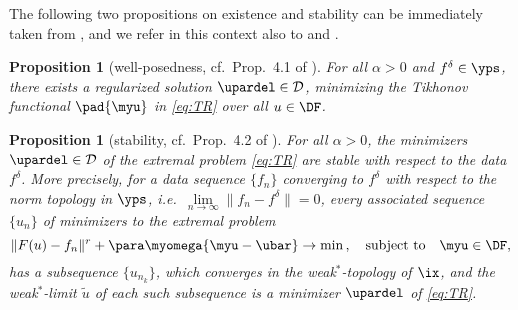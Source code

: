 \documentclass[10pt]{article}
\newtheorem{proposition}[theorem]{Proposition}
\theoremstyle{definition}
\begin{document}
The following two propositions on existence and stability can be immediately taken from \cite[\S~4.1.1]{Schusterbuch12}, and we refer in this context also to \cite{HKPS07} and \cite[\S~3.2]{Scherzetal09}.

\begin{proposition}[well-posedness, cf.~Prop.~4.1 of \cite{Schusterbuch12}]
For all $\alpha>0$ and  $f^\delta \in \yps$, there exists a regularized solution $\upardel \in \mathcal{D}$, minimizing the Tikhonov functional $\pad{\myu}$ in \eqref{eq:TR} over all $u \in \DF$.
\end{proposition}

\begin{proposition}[stability, cf.~Prop.~4.2 of \cite{Schusterbuch12}]
For all $\alpha>0$, the minimizers $\upardel \in \mathcal{D}$ of the extremal problem \eqref{eq:TR} are stable with respect to the data $f^\delta$. More precisely, for a data sequence $\{f_n\}$ converging to $f^\delta$ with respect to the norm topology in $\yps$,
i.e.~$\lim \limits_{n \to \infty}\|f_n-f^\delta\|=0$, every associated sequence $\{u_n\}$ of minimizers to the extremal problem
$$\|F(u)-f_n\|^r + \para \myomega{\myu-\ubar} \to \min\,, \quad \textup{subject to} \quad  \myu \in \DF,  $$
has a subsequence $\{u_{n_k}\}$, which converges in the weak$^*$-topology of $\ix$, and the weak$^*$-limit $\tilde u$ of each such subsequence is a minimizer $\upardel$ of \eqref{eq:TR}.
\end{proposition}
\end{document}
